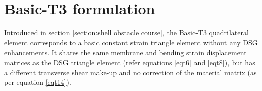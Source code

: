 
\chapter{Basic-T3 formulation}
\label{sec:Basic-T3 quadrilateral formulation}

Introduced in section \ref{section:shell obstacle course}, the Basic-T3 quadrilateral element corresponds to a basic constant strain triangle element without any DSG enhancements. It shares the same membrane and bending strain displacement matrices as the DSG triangle element (refer equations \ref{eqt6} and \ref{eqt8}), but has a different transverse shear make-up and no correction of the material matrix (as per equation \ref{eqt14}). 


